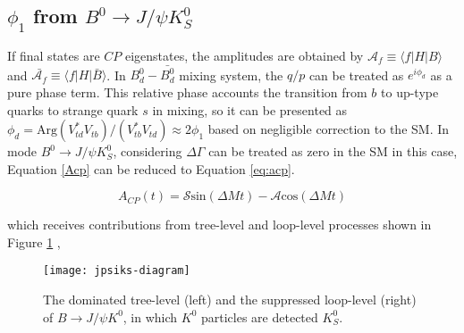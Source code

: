 \subsection{$\phi_1$  from $B^0 \to J/\psi K^0_S$}
If final states are $CP$ eigenstates, the amplitudes are obtained by $\mathcal{A}_f \equiv \langle f|H|B\rangle$ and $\bar{\mathcal{A}_f} \equiv \langle f|H|\bar{B}\rangle$. In $B_d^0-\bar{B_d^0}$ mixing system, the $q/p$ can be treated as $e^{i\phi_d}$ as a pure phase term. This relative phase accounts the transition from $b$ to up-type quarks to strange quark $s$ in mixing, so it can be presented as $\phi_d = \text{Arg}(V^*_{td}V_{tb})/(V^*_{tb}V_{td}) \approx 2\phi_1 $ based on negligible correction to the SM. In mode $B^0 \to J/\psi K^0_S$, considering $\Delta \Gamma$ can be treated as zero in the SM in this case\cite{dighe2001width}, Equation \ref{Acp} can be reduced to Equation \ref{eq:acp}.

\begin{equation}\label{eq:acp}
	A_{CP}(t)=\mathcal{S} \text{sin}(\Delta{M}t)- \mathcal{A}\text{cos}(\Delta{M}t)
\end{equation}

\begin{comment}
Usually, $S_f$ provides a good sensitivity to $\phi_1$ in Eq(1.42) by replacing $\phi_d$ inside $\lambda_f$ since the rest two equations canceled out the complex phase of $(q/p)$. For instance, in the process of  $b\to \bar{c}cs$ ,the amplitude contributions from tree level and loop level diagram can be written in a form as follows using the CKM unitary condition: 
\end{comment}
which receives contributions from tree-level and loop-level processes shown in Figure \ref{fig:jpsiks} , 

\begin{figure}[htpb]
	\centering
	\texttt{[image: jpsiks-diagram]}
	\caption{The dominated tree-level (left) and the suppressed loop-level (right) of $B\to J/\psi K^0$, in which $K^0$ particles are detected $K_S^0$\cite{wishahi2014measurement}.}
	\label{fig:jpsiks}
\end{figure}


